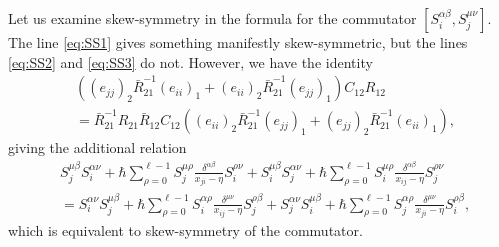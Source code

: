 \begin{remark}
Let us examine skew-symmetry in the formula for the commutator $[S_i^{\alpha\beta},S_j^{\mu\nu}]$. The line \eqref{eq:SS1} gives something manifestly skew-symmetric, but the lines \eqref{eq:SS2} and \eqref{eq:SS3} do not. However, we have the identity
\begin{equation}
\begin{aligned}
&\left( (e_{jj})_2 \bar R_{21}^{-1} (e_{ii})_1 + (e_{ii})_2 \bar R_{21}^{-1} (e_{jj})_1 \right) C_{12} R_{12} \\
&= \bar R_{21}^{-1} R_{21} \bar R_{12} C_{12} \left( (e_{ii})_2 \bar R_{21}^{-1} (e_{jj})_1 + (e_{jj})_2 \bar R_{21}^{-1} (e_{ii})_1 \right),
\end{aligned}
\end{equation}
giving the additional relation
\begin{equation}
\begin{aligned}
&S_j^{\mu\beta} S_i^{\alpha\nu} + \hbar \sum_{\rho=0}^{\ell-1} S_j^{\mu\rho} \frac{\delta^{\alpha\beta}}{x_{ji}-\eta} S_i^{\rho\nu} + S_i^{\mu\beta} S_j^{\alpha\nu} + \hbar \sum_{\rho=0}^{\ell-1} S_i^{\mu\rho} \frac{\delta^{\alpha\beta}}{x_{ij}-\eta} S_j^{\rho\nu} \\
&= S_i^{\alpha\nu} S_j^{\mu\beta} + \hbar \sum_{\rho=0}^{\ell-1} S_i^{\alpha\rho} \frac{\delta^{\mu\nu}}{x_{ij}-\eta} S_j^{\rho\beta} + S_j^{\alpha\nu} S_i^{\mu\beta} + \hbar \sum_{\rho=0}^{\ell-1} S_j^{\alpha\rho} \frac{\delta^{\mu\nu}}{x_{ji}-\eta} S_i^{\rho\beta},
\end{aligned}
\end{equation}
which is equivalent to skew-symmetry of the commutator.
\end{remark}

